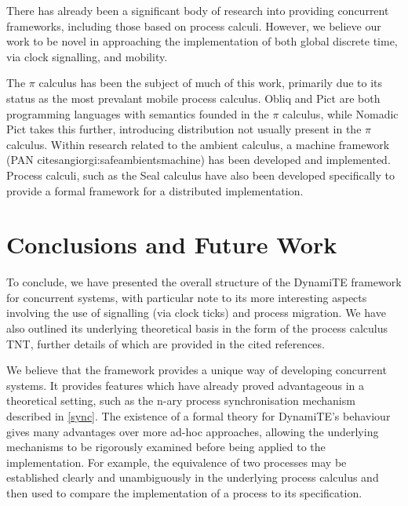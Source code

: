 \documentclass{sig-alternate}
\begin{document}
There has already been a significant body of research into providing
concurrent frameworks, including those based on process calculi.
However, we believe our work to be novel in approaching the
implementation of both global discrete time, via clock signalling, and
mobility.

The $\pi$ calculus has been the subject of much of this work, primarily
due to its status as the most prevalant mobile process calculus.  Obliq
\cite{obliq} and Pict \cite{daveturner:phd} are both programming
languages with semantics founded in the $\pi$ calculus, while Nomadic
Pict \cite{wojciechowski:phd} takes this further, introducing
distribution not usually present in the $\pi$ calculus.  Within research
related to the ambient calculus, a machine framework (PAN
cite{sangiorgi:safeambientsmachine}) has been developed and
implemented.  Process calculi, such as the Seal calculus \cite{seal}
have also been developed specifically to provide a formal framework for
a distributed implementation.

\section{Conclusions and Future Work}

To conclude, we have presented the overall structure of the DynamiTE
framework for concurrent systems, with particular note to its more
interesting aspects involving the use of signalling (via clock ticks)
and process migration.  We have also outlined its underlying theoretical
basis in the form of the process calculus TNT, further details of which
are provided in the cited references.

We believe that the framework provides a unique way of developing
concurrent systems.  It provides features which have already proved
advantageous in a theoretical setting, such as the n-ary process
synchronisation mechanism described in \ref{sync}.  The existence of a
formal theory for DynamiTE's behaviour gives many advantages over more
ad-hoc approaches, allowing the underlying mechanisms to be rigorously
examined before being applied to the implementation.  For example, the
equivalence of two processes may be established clearly and
unambiguously in the underlying process calculus and then used to
compare the implementation of a process to its specification.
\end{document}
